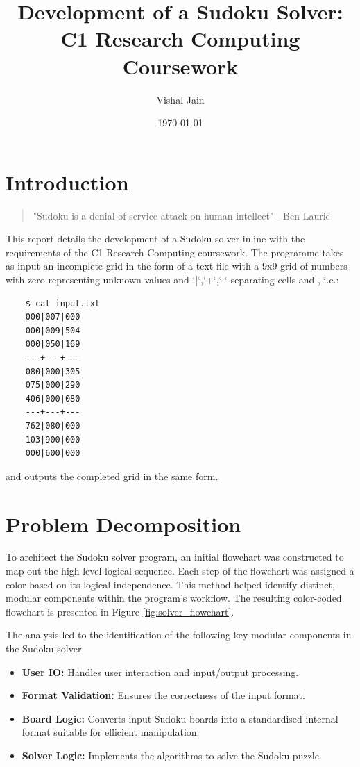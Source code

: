 \documentclass[11pt]{article}
\title{Development of a Sudoku Solver: C1 Research Computing Coursework}
\author{Vishal Jain}
\date{\today}
\begin{document}
\maketitle

\tableofcontents

\newpage

\section{Introduction}

\begin{quote}
    "Sudoku is a denial of service attack on human
  intellect" - Ben Laurie
\end{quote}

This report details the development of a Sudoku solver inline with the requirements of the C1 Research Computing coursework. The programme takes as input an incomplete grid in the form of a text file with a 9x9 grid of numbers with zero representing unknown values and `|`,`+`,`-` separating cells and , i.e.:


\begin{verbatim}
    $ cat input.txt
    000|007|000
    000|009|504
    000|050|169
    ---+---+---
    080|000|305
    075|000|290
    406|000|080
    ---+---+---
    762|080|000
    103|900|000
    000|600|000
    \end{verbatim}

and outputs the completed grid in the same form.


\section{Problem Decomposition}
To architect the Sudoku solver program, an initial flowchart was constructed to map out the high-level logical sequence. Each step of the flowchart was assigned a color based on its logical independence. This method helped identify distinct, modular components within the program's workflow. The resulting color-coded flowchart is presented in Figure \ref{fig:solver_flowchart}.


The analysis led to the identification of the following key modular components in the Sudoku solver:

\begin{itemize}
\item \textbf{User IO:} Handles user interaction and input/output processing.
\item \textbf{Format Validation:} Ensures the correctness of the input format.
\item \textbf{Board Logic:} Converts input Sudoku boards into a standardised internal format suitable for efficient manipulation.
\item \textbf{Solver Logic:} Implements the algorithms to solve the Sudoku puzzle.
\end{itemize}
\end{document}
